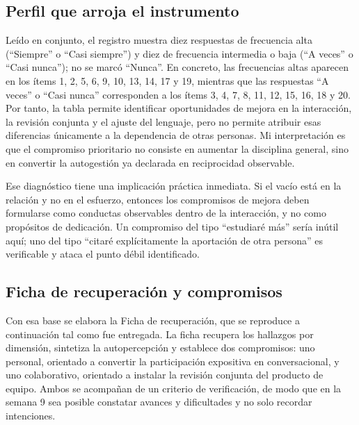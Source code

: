 \documentclass[
  spanish,
  letterpaper, oneside
]{article}
\begin{document}
\subsection{Perfil que arroja el instrumento}

Leído en conjunto, el registro muestra diez respuestas de frecuencia alta
(``Siempre'' o ``Casi siempre'') y diez de frecuencia intermedia o baja
(``A veces'' o ``Casi nunca''); no se marcó ``Nunca''. En concreto, las frecuencias
altas aparecen en los ítems 1, 2, 5, 6, 9, 10, 13, 14, 17 y 19, mientras que las
respuestas ``A veces'' o ``Casi nunca'' corresponden a los ítems 3, 4, 7, 8, 11,
12, 15, 16, 18 y 20. Por tanto, la tabla permite identificar oportunidades de
mejora en la interacción, la revisión conjunta y el ajuste del lenguaje, pero no
permite atribuir esas diferencias únicamente a la dependencia de otras personas.
Mi interpretación es que el compromiso prioritario no consiste en aumentar la
disciplina general, sino en convertir la autogestión ya declarada en reciprocidad
observable.

Ese diagnóstico tiene una implicación práctica inmediata. Si el vacío está en la
relación y no en el esfuerzo, entonces los compromisos de mejora deben formularse
como conductas observables dentro de la interacción, y no como propósitos de
dedicación. Un compromiso del tipo ``estudiaré más'' sería inútil aquí; uno del tipo
``citaré explícitamente la aportación de otra persona'' es verificable y ataca el
punto débil identificado.

\subsection{Ficha de recuperación y compromisos}

Con esa base se elabora la Ficha de recuperación, que se reproduce a continuación
tal como fue entregada. La ficha recupera los hallazgos por dimensión, sintetiza la
autopercepción y establece dos compromisos: uno personal, orientado a convertir la
participación expositiva en conversacional, y uno colaborativo, orientado a instalar
la revisión conjunta del producto de equipo. Ambos se acompañan de un criterio de
verificación, de modo que en la semana 9 sea posible constatar avances y dificultades
y no solo recordar intenciones.
\end{document}
